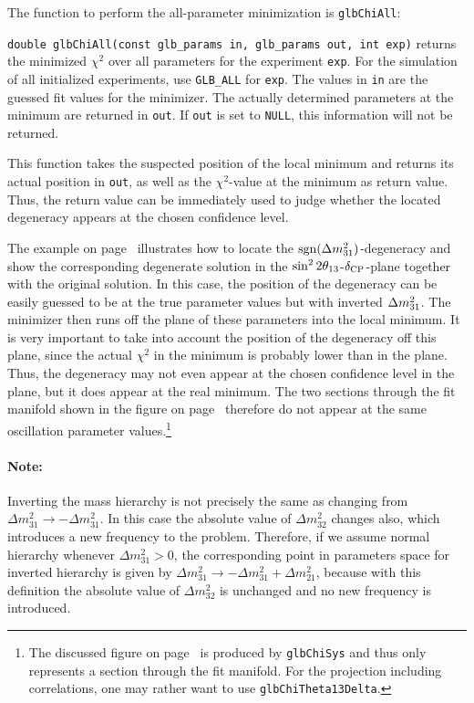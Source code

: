 The function to perform the all-parameter minimization is {\tt glbChiAll}:
\begin{function}
{\tt double glbChiAll(const glb\_params in, glb\_params out, int exp)}
  returns the minimized $\chi^2$ over all parameters for the  experiment {\tt exp}. For the simulation of all initialized experiments,
use {\tt GLB\_ALL} for {\tt exp}. The values in {\tt in} are the guessed fit values for the minimizer. The actually determined parameters at the minimum are returned in {\tt out}. If {\tt out} is set to {\tt NULL}, this information will not be returned.
\end{function}
%
This function takes the suspected position of the local minimum and returns its actual position in {\tt out}, as well as the $\chi^2$-value 
at the minimum as return value. Thus, the return value can be immediately
used to judge whether the located degeneracy appears at the chosen
confidence level.

The example on page~\pageref{ex:sgndeg} illustrates how to locate the $\mathrm{sgn}(\Delta m_{31}^2)$-degeneracy and show the corresponding degenerate solution in the $\sin^2 2 \theta_{13}$-$\delta_{\mathrm{CP}}$-plane together with the original solution.
In this case, the position of the degeneracy can be easily guessed to be 
at the true parameter values but with inverted  $\Delta m_{31}^2$.
The minimizer then runs off the plane of these parameters into the local minimum. It is very important to take into account the position of the degeneracy off this plane, since the actual $\chi^2$ in the minimum is probably lower than in the plane. Thus, the degeneracy may not even appear at the chosen confidence level in the plane, but it does appear at the real minimum. The two sections through the fit manifold shown in the figure on page~\pageref{ex:sgndeg} therefore do not appear at the same oscillation parameter values.\footnote{The discussed figure on page~\pageref{ex:sgndeg} is produced by  {\tt glbChiSys} and thus only represents a section through the fit manifold. For the projection including correlations, one may rather want to use {\tt glbChiTheta13Delta}.} 

\label{mass_ordering}
\paragraph{Note:} Inverting the mass hierarchy is not
precisely the same as changing from $\Delta m^2_{31}
\rightarrow -\Delta m^2_{31}$.
In this case the absolute value of $\Delta m^2_{32}$ changes also, which
introduces a new frequency to the problem. Therefore, if we assume
normal hierarchy  whenever $\Delta m^2_{31}>0$, the corresponding
point in parameters space for inverted hierarchy is given by $\Delta 
m^2_{31}\rightarrow - \Delta m^2_{31} + \Delta m^2_{21}$, because
with this definition the absolute value of  $\Delta m^2_{32}$ is unchanged
and no new frequency is introduced.\\

